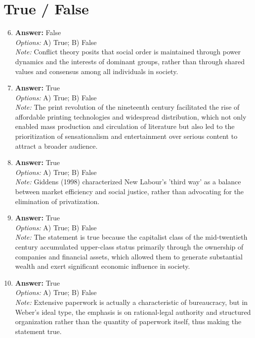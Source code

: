 \documentclass[12pt]{article}
\begin{document}
\section*{True / False}
\begin{enumerate}[label=\arabic*.]
\setcounter{enumi}{5}
\item \textbf{Answer:} False
\\ \textit{Options:} A) True; B) False
\\ \textit{Note:} Conflict theory posits that social order is maintained through power dynamics and the interests of dominant groups, rather than through shared values and consensus among all individuals in society.
\item \textbf{Answer:} True
\\ \textit{Options:} A) True; B) False
\\ \textit{Note:} The print revolution of the nineteenth century facilitated the rise of affordable printing technologies and widespread distribution, which not only enabled mass production and circulation of literature but also led to the prioritization of sensationalism and entertainment over serious content to attract a broader audience.
\item \textbf{Answer:} True
\\ \textit{Options:} A) True; B) False
\\ \textit{Note:} Giddens (1998) characterized New Labour's 'third way' as a balance between market efficiency and social justice, rather than advocating for the elimination of privatization.
\item \textbf{Answer:} True
\\ \textit{Options:} A) True; B) False
\\ \textit{Note:} The statement is true because the capitalist class of the mid-twentieth century accumulated upper-class status primarily through the ownership of companies and financial assets, which allowed them to generate substantial wealth and exert significant economic influence in society.
\item \textbf{Answer:} True
\\ \textit{Options:} A) True; B) False
\\ \textit{Note:} Extensive paperwork is actually a characteristic of bureaucracy, but in Weber's ideal type, the emphasis is on rational-legal authority and structured organization rather than the quantity of paperwork itself, thus making the statement true.
\end{enumerate}
\end{document}
